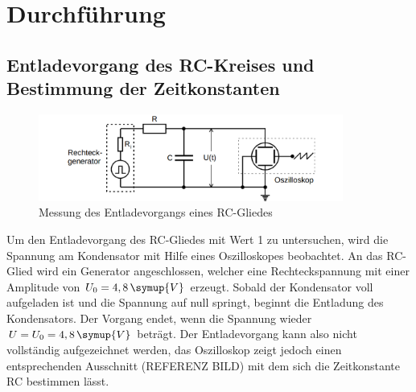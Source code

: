 \section{Durchführung}
\label{sec:Durchführung}
\subsection{Entladevorgang des RC-Kreises und Bestimmung der Zeitkonstanten}
\label{sec:Lade}
\begin{figure}
    \centering
    \includegraphics[width=10cm]{content/Schaltbild.png}
    \caption{Messung des Entladevorgangs eines RC-Gliedes \cite{sample}}
\end{figure}
\noindent Um den Entladevorgang des RC-Gliedes mit Wert 1 zu untersuchen,
wird die Spannung am Kondensator mit Hilfe eines
Oszilloskopes beobachtet. An das RC-Glied wird ein 
Generator angeschlossen, welcher eine Rechteckspannung
mit einer Amplitude von $U_0=4,8\,\symup{V}$ erzeugt.
Sobald der Kondensator voll aufgeladen ist und die Spannung
auf null springt, beginnt die Entladung des Kondensators.
Der Vorgang endet, wenn die Spannung wieder $U=U_0=4,8\,\symup{V}$
beträgt. Der Entladevorgang kann also nicht vollständig
aufgezeichnet werden, das Oszilloskop zeigt jedoch
einen entsprechenden Ausschnitt (REFERENZ BILD) mit dem
sich die Zeitkonstante RC bestimmen lässt.


